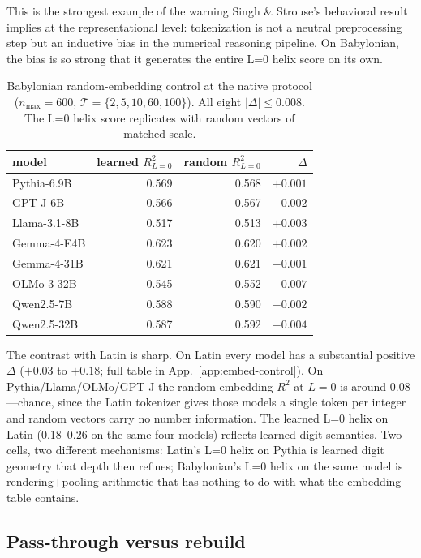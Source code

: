 \documentclass[10pt,letterpaper]{article}
\begin{document}
This is the strongest example of the warning Singh \& Strouse's
behavioral result implies at the representational level: tokenization
is not a neutral preprocessing step but an inductive bias in the
numerical reasoning pipeline. On Babylonian, the bias is so strong
that it generates the entire L=0 helix score on its own.

\begin{table}[t]
\caption{Babylonian random-embedding control at the native protocol
  ($n_{\max}=600$, $\mathcal{T}=\{2,5,10,60,100\}$). All eight
  $|\Delta| \le 0.008$. The L=0 helix score replicates with random
  vectors of matched scale.}
\label{tab:bab-rand}
\centering
\small
\begin{tabular}{lrrr}
\toprule
model            & learned $R^2_{L=0}$ & random $R^2_{L=0}$ & $\Delta$ \\
\midrule
Pythia-6.9B      & 0.569 & 0.568 & $+0.001$ \\
GPT-J-6B         & 0.566 & 0.567 & $-0.002$ \\
Llama-3.1-8B     & 0.517 & 0.513 & $+0.003$ \\
Gemma-4-E4B      & 0.623 & 0.620 & $+0.002$ \\
Gemma-4-31B      & 0.621 & 0.621 & $-0.001$ \\
OLMo-3-32B       & 0.545 & 0.552 & $-0.007$ \\
Qwen2.5-7B       & 0.588 & 0.590 & $-0.002$ \\
Qwen2.5-32B      & 0.587 & 0.592 & $-0.004$ \\
\bottomrule
\end{tabular}
\end{table}

The contrast with Latin is sharp. On Latin every model has a
substantial positive $\Delta$ ($+0.03$ to $+0.18$; full table in
App.~\ref{app:embed-control}). On Pythia/Llama/OLMo/GPT-J the
random-embedding $R^2$ at $L=0$ is around $0.08$---chance, since the
Latin tokenizer gives those models a single token per integer and
random vectors carry no number information. The learned L=0 helix on
Latin (0.18--0.26 on the same four models) reflects learned digit
semantics. Two cells, two different mechanisms: Latin's L=0 helix
on Pythia is learned digit geometry that depth then refines;
Babylonian's L=0 helix on the same model is rendering+pooling
arithmetic that has nothing to do with what the embedding table
contains.

\subsection{Pass-through versus rebuild}
\label{sec:results-cka}
\end{document}
